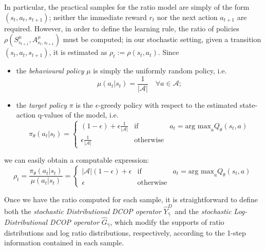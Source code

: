 \documentclass[12pt,a4paper,openright,twoside]{article}
\numberwithin{equation}{section}
\theoremstyle{definition}
\theoremstyle{remark}
\theoremstyle{plain}
\begin{document}
In particular, the practical samples for the ratio model are simply of the form $(s_t,a_t,s_{t+1})$; neither the immediate reward $r_t$ nor the next action $a_{t+1}$ are required. However, in order to define the learning rule, the ratio of policies $\rho(S^{\mu}_{s_{t+1}},A^{\mu}_{s_{t},s_{t+1}})$ must be computed; in our stochastic setting, given a transition $(s_t,a_t,s_{t+1})$, it is estimated as $\rho_t := \rho(s_t,a_t)$. Since
\begin{itemize}
    \item the \textit{behavioural policy} $\mu$ is simply the uniformly random policy, i.e. 
    \begin{equation*} \label{behaviourPolicy}
        \mu(a_t|s_t) = \frac{1}{|\mathcal{A}|} \quad \forall a \in \mathcal{A};
    \end{equation*}
    \item the \textit{target policy} $\pi$ is the $\epsilon$-greedy policy with respect to the estimated state-action q-values of the model, i.e.
    \begin{equation*} \label{targetPolicy}
        \pi_\theta (a_t|s_t) = 
        \left\{ 
            \begin{array}{lcc}
                (1-\epsilon)+\epsilon \frac{1}{|\mathcal{A}|} &   \text{if} & a_t = \text{arg max}_{a} Q_\theta(s_t,a) \\
                \epsilon \frac{1}{|\mathcal{A}|} &  \text{otherwise} &
            \end{array}
        \right. 
    \end{equation*}
\end{itemize}
we can easily obtain a computable expression:
\begin{equation} \label{policyQuotient}
        \rho_t = \frac{\pi_\theta (a_t|s_t)}{\mu(a_t|s_t)} = 
        \left\{ 
            \begin{array}{lcc}
                |\mathcal{A}|(1-\epsilon)+\epsilon  &   \text{if} & a_t = \text{arg max}_a Q_\theta(s_t,a) \\
                \epsilon  &  \text{otherwise} &
            \end{array}
        \right. 
\end{equation}

Once we have the ratio computed for each sample, it is straightforward to define both the \textit{stochastic Distributional DCOP operator} $\hat{Y}^D_{\hat{\gamma}}$ and the \textit{stochastic Log-Distributional DCOP operator} $\hat{G}_{\hat{\gamma}}$, which modify the supports of ratio distributions and log ratio distributions, respectively, according to the 1-step information contained in each sample.
\end{document}
